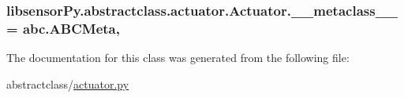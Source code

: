 \subsubsection[{\+\_\+\+\_\+metaclass\+\_\+\+\_\+}]{\setlength{\rightskip}{0pt plus 5cm}libsensor\+Py.\+abstractclass.\+actuator.\+Actuator.\+\_\+\+\_\+metaclass\+\_\+\+\_\+ = abc.\+A\+B\+C\+Meta\hspace{0.3cm}{\ttfamily [static]}, {\ttfamily [private]}}\label{classlibsensorPy_1_1abstractclass_1_1actuator_1_1Actuator_ac248e8fdf90e84dfefbd61f758e55499}


The documentation for this class was generated from the following file\+:\begin{DoxyCompactItemize}
\item 
abstractclass/\hyperlink{actuator_8py}{actuator.\+py}\end{DoxyCompactItemize}
